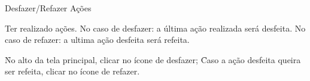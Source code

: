 \begin{funcionalidade}{Desfazer/Refazer Ações}



	\condicao
	{Ter realizado ações.} %
	{No caso de desfazer: a última ação realizada será desfeita. No caso de refazer: a ultima ação desfeita será refeita.} %

	\begin{fluxo}
		\f No alto da tela principal, clicar no ícone de desfazer;
			\subf
			\f Caso a ação desfeita queira ser refeita, clicar no ícone de refazer.
			\voltaf

	\end{fluxo}


\end{funcionalidade}